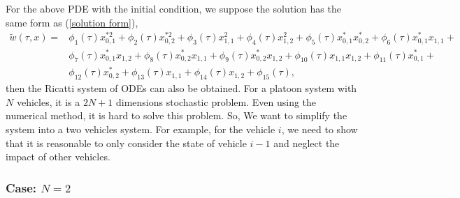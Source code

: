 \documentclass{article}
\begin{document}
For the above PDE with the initial condition, we suppose the solution has the same form as (\ref{solution form}), 
\begin{equation*}
\begin{array}
{ll}
\widetilde{w}(\tau,x) =
& \displaystyle \phi_{1}(\tau) x_{0,1}^{* 2} + \phi_{2}(\tau) x_{0,2}^{* 2} + \phi_{3}(\tau) x_{1,1}^{2} + \phi_{4}(\tau) x_{1,2}^{2} + \phi_{5}(\tau) x_{0,1}^{*} x_{0,2}^{*} + \phi_{6}(\tau) x_{0,1}^{*} x_{1,1} +
\\
& \displaystyle
\phi_{7}(\tau) x_{0,1}^{*} x_{1,2} +  \phi_{8}(\tau) x_{0,2}^{*} x_{1,1} + \phi_{9}(\tau) x_{0,2}^{*} x_{1,2} + \phi_{10}(\tau) x_{1,1}x_{1,2} + \phi_{11}(\tau) x_{0,1}^{*} + 
 \\ & \displaystyle
\phi_{12}(\tau) x_{0,2}^{*} + \phi_{13}(\tau) x_{1,1} + \phi_{14}(\tau) x_{1,2} +  \phi_{15}(\tau),
\end{array}
\end{equation*}
then the Ricatti system of ODEs can also be obtained. For a platoon system with $N$ vehicles, it is a $2N+1$ dimensions stochastic problem. Even using the numerical method, it is hard to solve this problem. So, We want to simplify the system into a two vehicles system. For example, for the vehicle $i$, we need to show that it is reasonable to only consider the state of vehicle $i-1$ and neglect the impact of other vehicles.

\subsubsection{Case: $N = 2$}
\end{document}
